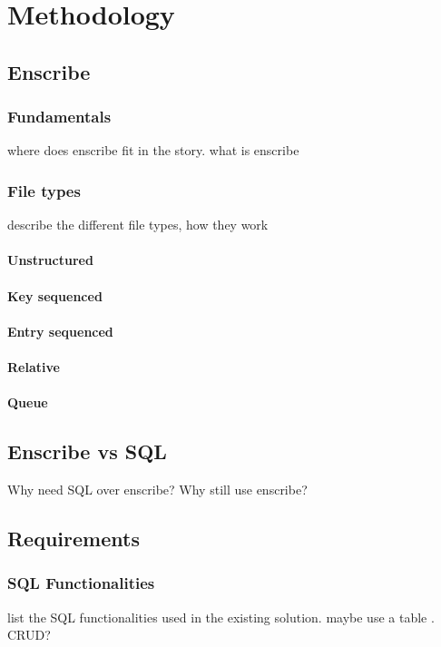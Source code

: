
\chapter{Methodology}
\label{ch:methodology}

\section{Enscribe}
\subsection{Fundamentals}
where does enscribe fit in the story. what is enscribe
\subsection{File types}
describe the different file types, how they work
\subsubsection{Unstructured}
\subsubsection{Key sequenced}
\subsubsection{Entry sequenced}
\subsubsection{Relative}
\subsubsection{Queue}
\section{Enscribe vs SQL}
Why need SQL over enscribe? Why still use enscribe?
\section{Requirements}
\subsection{SQL Functionalities}
list the SQL functionalities used in the existing solution. maybe use a table . CRUD?
